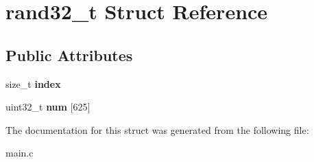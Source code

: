 \hypertarget{structrand32__t}{}\section{rand32\+\_\+t Struct Reference}
\label{structrand32__t}
\subsection*{Public Attributes}
\begin{DoxyCompactItemize}
\item 
\hypertarget{structrand32__t_ab5adcfa1711ec0bad8670970cc720952}{}size\+\_\+t {\bfseries index}\label{structrand32__t_ab5adcfa1711ec0bad8670970cc720952}

\item 
\hypertarget{structrand32__t_a4871f8757c85e495677e187e3b1f95d1}{}uint32\+\_\+t {\bfseries num} \mbox{[}625\mbox{]}\label{structrand32__t_a4871f8757c85e495677e187e3b1f95d1}

\end{DoxyCompactItemize}


The documentation for this struct was generated from the following file\+:\begin{DoxyCompactItemize}
\item 
main.\+c\end{DoxyCompactItemize}
